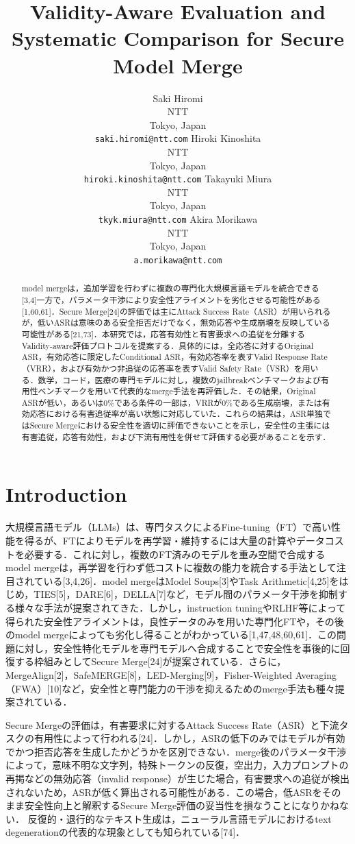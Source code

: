 \documentclass{article}
\title{Validity-Aware Evaluation and Systematic Comparison for Secure Model Merge}
\author{%
  Saki Hiromi \\
  NTT \\
  Tokyo, Japan \\
  \texttt{saki.hiromi@ntt.com}
  \And
  Hiroki Kinoshita \\
  NTT \\
  Tokyo, Japan \\
  \texttt{hiroki.kinoshita@ntt.com}
  \And
  Takayuki Miura \\
  NTT \\
  Tokyo, Japan \\
  \texttt{tkyk.miura@ntt.com}
  \And
  Akira Morikawa \\
  NTT \\
  Tokyo, Japan \\
  \texttt{a.morikawa@ntt.com}
}
\begin{document}
\maketitle


\begin{abstract}
model mergeは，追加学習を行わずに複数の専門化大規模言語モデルを統合できる[3,4]一方で，パラメータ干渉により安全性アライメントを劣化させる可能性がある[1,60,61]．Secure Merge[24]の評価では主にAttack Success Rate（ASR）が用いられるが，低いASRは意味のある安全拒否だけでなく，無効応答や生成崩壊を反映している可能性がある[21,73]．本研究では，応答有効性と有害要求への追従を分離するValidity-aware評価プロトコルを提案する．具体的には，全応答に対するOriginal ASR，有効応答に限定したConditional ASR，有効応答率を表すValid Response Rate（VRR），および有効かつ非追従の応答率を表すValid Safety Rate（VSR）を用いる．数学，コード，医療の専門モデルに対し，複数のjailbreakベンチマークおよび有用性ベンチマークを用いて代表的なmerge手法を再評価した．その結果，Original ASRが低い，あるいは0\%である条件の一部は，VRRが0\%である生成崩壊，または有効応答における有害追従率が高い状態に対応していた．これらの結果は，ASR単独ではSecure Mergeにおける安全性を適切に評価できないことを示し，安全性の主張には有害追従，応答有効性，および下流有用性を併せて評価する必要があることを示す．
\end{abstract}

\section{Introduction}
大規模言語モデル（LLMs）は、専門タスクによるFine-tuning（FT）で高い性能を得るが、FTによりモデルを再学習・維持するには大量の計算やデータコストを必要する．これに対し，複数のFT済みのモデルを重み空間で合成するmodel mergeは，再学習を行わず低コストに複数の能力を統合する手法として注目されている[3,4,26]．model mergeはModel Soups[3]やTask Arithmetic[4,25]をはじめ，TIES[5]，DARE[6]，DELLA[7]など，モデル間のパラメータ干渉を抑制する様々な手法が提案されてきた．しかし，instruction tuningやRLHF等によって得られた安全性アライメントは，良性データのみを用いた専門化FTや，その後のmodel mergeによっても劣化し得ることがわかっている[1,47,48,60,61]．この問題に対し，安全性特化モデルを専門モデルへ合成することで安全性を事後的に回復する枠組みとしてSecure Merge[24]が提案されている．さらに，MergeAlign[2]，SafeMERGE[8]，LED-Merging[9]，Fisher-Weighted Averaging（FWA）[10]など，安全性と専門能力の干渉を抑えるためのmerge手法も種々提案されている．

Secure Mergeの評価は，有害要求に対するAttack Success Rate（ASR）と下流タスクの有用性によって行われる[24]．しかし，ASRの低下のみではモデルが有効でかつ拒否応答を生成したかどうかを区別できない．merge後のパラメータ干渉によって，意味不明な文字列，特殊トークンの反復，空出力，入力プロンプトの再掲などの無効応答（invalid response）が生じた場合，有害要求への追従が検出されないため，ASRが低く算出される可能性がある．この場合，低ASRをそのまま安全性向上と解釈するSecure Merge評価の妥当性を損なうことになりかねない．
\color{red}
反復的・退行的なテキスト生成は，ニューラル言語モデルにおけるtext degenerationの代表的な現象としても知られている[74]．
\color{black}
\end{document}
